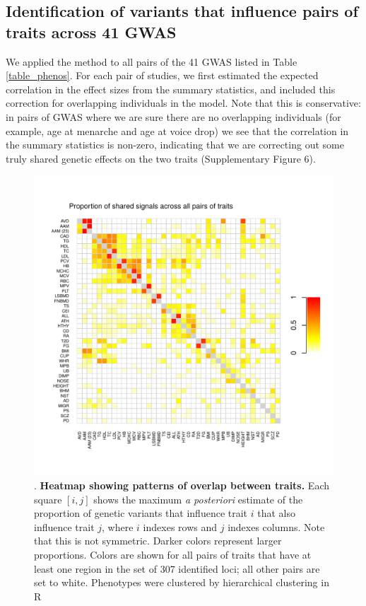 \documentclass[11pt,titlepage]{article}
\begin{document}
\subsection{Identification of variants that influence pairs of traits across 41 GWAS}
We applied the method to all pairs of the 41 GWAS listed in Table \ref{table_phenos}.
For each pair of studies, we first estimated the expected correlation in the effect sizes from the summary statistics, and included this correction for overlapping individuals in the model. 
Note that this is conservative: in pairs of GWAS where we are sure there are no overlapping individuals (for example, age at menarche and age at voice drop) we see that the correlation in the summary statistics is non-zero, indicating that we are correcting out some truly shared genetic effects on the two traits (Supplementary Figure 6).


\begin{figure}
\begin{center}
\includegraphics[scale = 0.8]{figs/heatmap.pdf}
\caption{. \textbf{Heatmap showing patterns of overlap between traits.} Each square $[i,j]$ shows the maximum \emph{a posteriori} estimate of the proportion of genetic variants that influence trait $i$ that also influence trait $j$, where $i$ indexes rows and $j$ indexes columns. Note that this is not symmetric. Darker colors represent larger proportions. Colors are shown for all pairs of traits that have at least one region in the set of 307 identified loci; all other pairs are set to white. Phenotypes were clustered by hierarchical clustering in R \citep{R-Core-Team:2013aa}}\label{f_overlap}
\end{center}
\end{figure}
\end{document}
